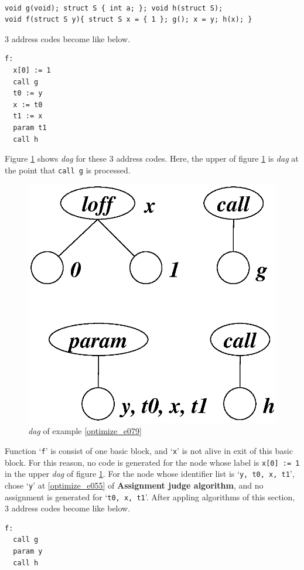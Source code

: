 \begin{Example}
\label{optimize_e079}
\begin{verbatim}

void g(void); struct S { int a; }; void h(struct S);
void f(struct S y){ struct S x = { 1 }; g(); x = y; h(x); }
\end{verbatim}
3 address codes become like below.
\begin{verbatim}
f:
  x[0] := 1
  call g
  t0 := y
  x := t0
  t1 := x
  param t1
  call h
\end{verbatim}
Figure \ref{optimize_e080} shows {\em dag} for these 3 address codes.
Here, the upper of figure \ref{optimize_e080} is {\em dag}
at the point that {\tt{call g}} is processed.
\begin{figure}[htbp]
\begin{center}
\includegraphics[width=0.6\linewidth,height=0.6\linewidth]{opt033.eps}
\caption{{\em dag} of example \ref{optimize_e079}}
\label{optimize_e080}
\end{center}
\end{figure}
Function `{\tt{f}}' is consist of one basic block, and 
`{\tt{x}}' is not alive in exit of this basic block.
For this reason, no code is generated
for the node whose label is {\tt{x[0] :=
 1}} in the upper {\em dag} of figure \ref{optimize_e080}.
For the node whose identifier list is `{\tt{y, t0, x, t1}}',
chose `{\tt{y}}' at \ref{optimize_e055} of {\bf Assignment judge
algorithm}, and no assignment is generated for `{\tt{t0, x, t1}}'.
After appling algorithms of this section,
3 address codes become like below.
\begin{verbatim}
f:
  call g
  param y
  call h
\end{verbatim}
\end{Example}

